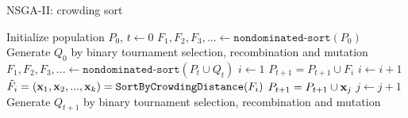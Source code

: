 \begin{frame}[allowframebreaks]{NSGA-II: crowding sort}
\framebreak

\begin{algorithm}[H]

  \begin{center}
  \caption{NSGA-II}
    \begin{algorithmic}[1]
   	\begin{footnotesize}
    \State Initialize population $P_0$, $t \leftarrow 0$
    \State $F_1, F_2, F_3, ... \leftarrow \texttt{nondominated-sort}(P_0)$
    \State Generate $Q_0$ by binary tournament selection, recombination and mutation
      \Repeat
        \State $F_1, F_2, F_3, ... \leftarrow \texttt{nondominated-sort}(P_t \cup Q_t)$
        \State $i \leftarrow 1$
        	\State $P_{t + 1} = P_{t + 1} \cup F_i$
        	\State $i \leftarrow i + 1$
    	\EndWhile
        \State $\tilde F_i = (\mathbf{x}_1, \mathbf{x}_2, ..., \mathbf{x}_k)= \texttt{SortByCrowdingDistance}(F_i)$
        	\State $P_{t + 1} = P_{t + 1} \cup \mathbf{x}_j$
        	\State $j \leftarrow j + 1$
        \EndWhile
        \State Generate $Q_{t + 1}$ by binary tournament selection, recombination and mutation
      \vspace*{-0.3cm}
      \end{footnotesize}
    \end{algorithmic}
    \end{center}
\end{algorithm}

\end{frame}








